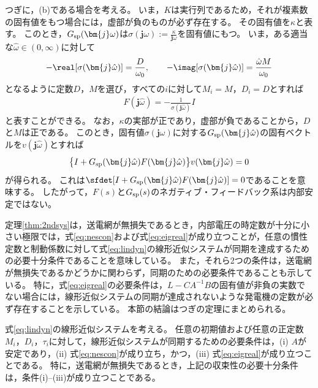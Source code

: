 \documentclass[tombow,dvipdfmx]{corona-a5}
\begin{document}
\begin{証明}
つぎに，(b)である場合を考える。
いま，$K$は実行列であるため，それが複素数の固有値をもつ場合には，虚部が負のものが必ず存在する。
その固有値を$\kappa$と表す。
このとき，$G_{\rm sp}(\bm{j} \omega)$は$\sigma (\bm{j} \omega):= \frac{\kappa}{\bm{j} \omega}$を固有値にもつ。
いま，ある適当な$\hat{\omega}\in (0,\infty)$に対して
\begin{align}\label{eq:Fspara}
-\real[\sigma(\bm{j} \hat{\omega})]  = \frac{D}{\omega_0}
,\qquad
-\imag[\sigma(\bm{j} \hat{\omega})]  = \frac{\hat{\omega} M}{\omega_0}
\end{align}
となるように定数$D$，$M$を選び，すべての$i$に対して$M_i=M$，$D_i=D$とすれば
\begin{align*}
F(\bm{j} \hat{\omega}) = - \frac{1}{ \sigma(\bm{j} \hat{\omega}) } I
\end{align*}
と表すことができる。
なお，$\kappa$の実部が正であり，虚部が負であることから，$D$と$M$は正である。
このとき，固有値$\sigma (\bm{j} \omega)$に対する$G_{\rm sp}(\bm{j} \hat{\omega})$の固有ベクトルを$v(\bm{j} \hat{\omega})$とすれば
\begin{align*}
\bigl\{ I+G_{\rm sp}(\bm{j} \hat{\omega})F(\bm{j} \hat{\omega})\bigr\}
v(\bm{j} \hat{\omega})
=0
\end{align*}
が得られる。
これは$\sfdet [I+G_{\rm sp}(\bm{j} \hat{\omega}) F(\bm{j} \hat{\omega})]=0$であることを意味する。
したがって，$F(s)$と$G_{\rm sp}(s)$のネガティブ・フィードバック系は内部安定ではない。
\end{証明}




定理\ref{thm:2ndsys}は，送電網が無損失であるとき，内部電圧の時定数が十分に小さい極限では，式\ref{eq:nescon}および式\ref{eq:eigreal}が成り立つことが，任意の慣性定数と制動係数に対して式\ref{eq:lindyn}の線形近似システムが同期を達成するための必要十分条件であることを意味している。
また，それら2つの条件は，送電網が無損失であるかどうかに関わらず，同期のための必要条件であることも示している。
特に，式\ref{eq:eigreal}の必要条件は，$L-CA^{-1}B$の固有値が非負の実数でない場合には，線形近似システムの同期が達成されないような発電機の定数が必ず存在することを示している。
本節の結論はつぎの定理にまとめられる。


\begin{定理}\label{thm:sync}
式\ref{eq:lindyn}の線形近似システムを考える。
任意の初期値および任意の正定数$M_i$，$D_i$，$\tau_i$に対して，線形近似システムが同期するための必要条件は，(i) $A$が安定であり，(ii) 式\ref{eq:nescon}が成り立ち，かつ，(iii) 式\ref{eq:eigreal}が成り立つことである。
特に，送電網が無損失であるとき，上記の収束性の必要十分条件は，条件(i)--(iii)が成り立つことである。
\end{定理}
\end{document}
